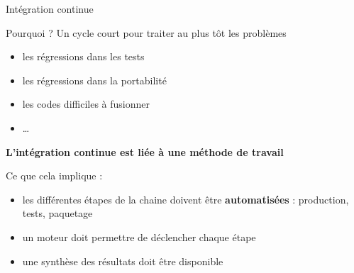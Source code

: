 \documentclass[9pt]{beamer}
\begin{document}
\begin{frame}{Intégration continue}

  \begin{block}{Pourquoi ?}
    Un cycle court pour traiter au plus tôt les problèmes
    \begin{itemize}
    \item les régressions dans les tests
    \item les régressions dans la portabilité
    \item les codes difficiles à fusionner 
    \item \dots
  \end{itemize}
  
  \textbf{L'intégration continue est liée à une méthode de travail}
  
\end{block}

\begin{block}{Ce que cela implique :}
\begin{itemize}
\item les différentes étapes de la chaine doivent être \textbf{automatisées} : production, tests, paquetage
\item un moteur doit permettre de déclencher chaque étape
\item une synthèse des résultats doit être disponible
\end{itemize}
\end{block}
\end{frame}
\end{document}
